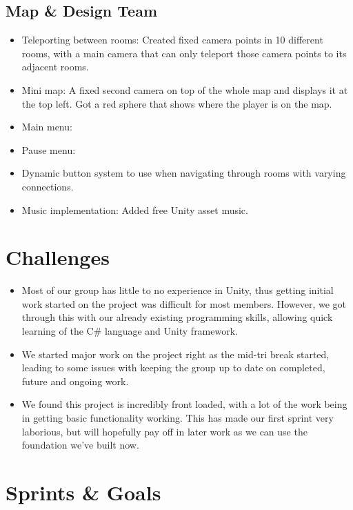 \documentclass{article}
\begin{document}
\subsection*{Map \& Design Team}
\begin{itemize}
    \item Teleporting between rooms: Created fixed camera points in 10 different rooms, with a main camera that can only teleport those camera points to its adjacent rooms.
    \item Mini map: A fixed second camera on top of the whole map and displays it at the top left. Got a red sphere that shows where the player is on the map.
    \item Main menu:
    \item Pause menu: 
    \item Dynamic button system to use when navigating through rooms with varying connections.
    \item Music implementation: Added free Unity asset music. 
\end{itemize}


\section*{Challenges}
\begin{itemize}
    \item Most of our group has little to no experience in Unity, thus getting initial work started on the project was difficult for most members. However, we got through this with our already existing programming skills, allowing quick learning of the C\# language and Unity framework.
    \item We started major work on the project right as the mid-tri break started, leading to some issues with keeping the group up to date on completed, future and ongoing work.
    \item We found this project is incredibly front loaded, with a lot of the work being in getting basic functionality working. This has made our first sprint very laborious, but will hopefully pay off in later work as we can use the foundation we've built now.
\end{itemize}

\section*{Sprints \& Goals}
\end{document}
